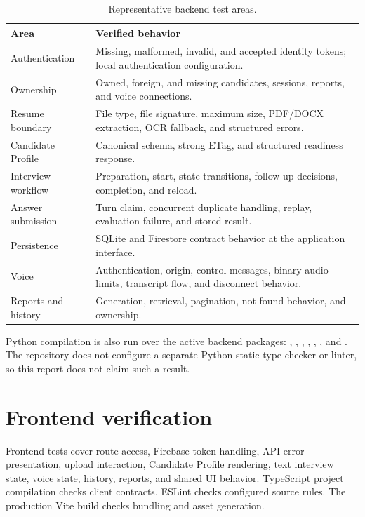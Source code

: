 \begin{table}[htbp]\centering
\caption{Representative backend test areas.}\label{tab:backend-tests}
\begin{tabularx}{\textwidth}{p{}Y}\toprule
Area & Verified behavior\\ \midrule
Authentication & Missing, malformed, invalid, and accepted identity tokens; local authentication configuration.\\
Ownership & Owned, foreign, and missing candidates, sessions, reports, and voice connections.\\
Resume boundary & File type, file signature, maximum size, PDF/DOCX extraction, OCR fallback, and structured errors.\\
Candidate Profile & Canonical schema, strong ETag, and structured readiness response.\\
Interview workflow & Preparation, start, state transitions, follow-up decisions, completion, and reload.\\
Answer submission & Turn claim, concurrent duplicate handling, replay, evaluation failure, and stored result.\\
Persistence & SQLite and Firestore contract behavior at the application interface.\\
Voice & Authentication, origin, control messages, binary audio limits, transcript flow, and disconnect behavior.\\
Reports and history & Generation, retrieval, pagination, not-found behavior, and ownership.\\
\bottomrule\end{tabularx}
\end{table}

Python compilation is also run over the active backend packages: , , , , , , and . The repository does not configure a separate Python static type checker or linter, so this report does not claim such a result.

\section{Frontend verification}

Frontend tests cover route access, Firebase token handling, API error presentation, upload interaction, Candidate Profile rendering, text interview state, voice state, history, reports, and shared UI behavior. TypeScript project compilation checks client contracts. ESLint checks configured source rules. The production Vite build checks bundling and asset generation.

